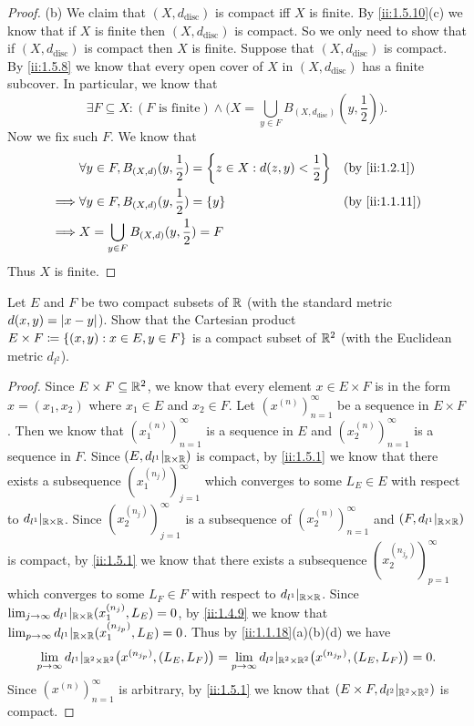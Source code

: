 \begin{proof}{(b)}
  We claim that \((X, d_{\text{disc}})\) is compact iff \(X\) is finite.
  By \cref{ii:1.5.10}(c) we know that if \(X\) is finite then \((X, d_{\text{disc}})\) is compact.
  So we only need to show that if \((X, d_{\text{disc}})\) is compact then \(X\) is finite.
  Suppose that \((X, d_{\text{disc}})\) is compact.
  By \cref{ii:1.5.8} we know that every open cover of \(X\) in \((X, d_{\text{disc}})\) has a finite subcover.
  In particular, we know that
  \[
    \exists F \subseteq X : (F \text{ is finite}) \land \bigg(X = \bigcup_{y \in F} B_{(X, d_{\text{disc}})}(y, \dfrac{1}{2})\bigg).
  \]
  Now we fix such \(F\).
  We know that
  \begin{align*}
             & \forall y \in F, B_{(X, d)}(y, \dfrac{1}{2}) = \set{z \in X : d(z, y) < \dfrac{1}{2}} &  & \by{ii:1.2.1}  \\
    \implies & \forall y \in F, B_{(X, d)}(y, \dfrac{1}{2}) = \set{y}                                &  & \by{ii:1.1.11} \\
    \implies & X = \bigcup_{y \in F} B_{(X, d)}(y, \dfrac{1}{2}) = F
  \end{align*}
  Thus \(X\) is finite.
\end{proof}

\begin{ex}\label{ii:ex:1.5.13}
  Let \(E\) and \(F\) be two compact subsets of \(\mathbb{R}\) (with the standard metric \(d(x, y) = \left\lvert x - y\right\rvert\)).
  Show that the Cartesian product \(E \times F \coloneqq \left\lbrace(x, y) : x \in E, y \in F\right\rbrace\) is a compact subset of \(\mathbb{R}^2\) (with the Euclidean metric \(d_{l^2}\)).
\end{ex}

\begin{proof}
  Since \(E \times F \subseteq \mathbb{R}^2\), we know that every element \(x \in E \times F\) is in the form \(x = (x_1, x_2)\) where \(x_1 \in E\) and \(x_2 \in F\).
  Let \((x^{(n)})_{n = 1}^\infty\) be a sequence in \(E \times F\).
  Then we know that \((x_1^{(n)})_{n = 1}^\infty\) is a sequence in \(E\) and \((x_2^{(n)})_{n = 1}^\infty\) is a sequence in \(F\).
  Since \((E, d_{l^1}|_{\mathbb{R} \times \mathbb{R}})\) is compact, by \cref{ii:1.5.1} we know that there exists a subsequence \((x_1^{(n_j)})_{j = 1}^\infty\) which converges to some \(L_E \in E\) with respect to \(d_{l^1}|_{\mathbb{R} \times \mathbb{R}}\).
  Since \((x_2^{(n_j)})_{j = 1}^\infty\) is a subsequence of \((x_2^{(n)})_{n = 1}^\infty\) and \((F, d_{l^1}|_{\mathbb{R} \times \mathbb{R}})\) is compact, by \cref{ii:1.5.1} we know that there exists a subsequence \((x_2^{(n_{j_p})})_{p = 1}^\infty\) which converges to some \(L_F \in F\) with respect to \(d_{l^1}|_{\mathbb{R} \times \mathbb{R}}\).
  Since \(\lim_{j \to \infty} d_{l^1}|_{\mathbb{R} \times \mathbb{R}}(x_1^{(n_j)}, L_E) = 0\), by \cref{ii:1.4.9} we know that \(\lim_{p \to \infty} d_{l^1}|_{\mathbb{R} \times \mathbb{R}}(x_1^{(n_{j_p})}, L_E) = 0\).
  Thus by \cref{ii:1.1.18}(a)(b)(d) we have
  \[
    \lim_{p \to \infty} d_{l^1}|_{\mathbb{R}^2 \times \mathbb{R}^2}\big(x^{(n_{j_p})}, (L_E, L_F)\big) = \lim_{p \to \infty} d_{l^2}|_{\mathbb{R}^2 \times \mathbb{R}^2}\big(x^{(n_{j_p})}, (L_E, L_F)\big) = 0.
  \]
  Since \((x^{(n)})_{n = 1}^\infty\) is arbitrary, by \cref{ii:1.5.1} we know that \((E \times F, d_{l^2}|_{\mathbb{R}^2 \times \mathbb{R}^2})\) is compact.
\end{proof}

